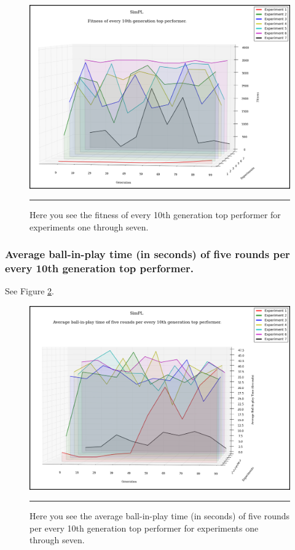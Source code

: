 \begin{figure}[htbp]  
  \centering
  \includegraphics[width=5in]{../Figures/Chapter3/all_10_tops.png}
  \rule{35em}{0.5pt}
  \caption[Top Performers Composite]{Here you see the fitness of every 10th generation top performer for experiments one through seven.}
  \label{fig:all_10_tops}
\end{figure}

\subsubsection{Average ball-in-play time (in seconds) of five rounds per every 10th generation top performer.}

See Figure \ref{fig:all_10_tops_times}.

\begin{figure}[htbp]  
  \centering
  \includegraphics[width=5in]{../Figures/Chapter3/all_10_tops_times.png}
  \rule{35em}{0.5pt}
  \caption[Top Performers Tournament Composite]{Here you see the average ball-in-play time (in seconds) of five rounds per every 10th generation top performer for experiments one through seven.}
  \label{fig:all_10_tops_times}
\end{figure}

